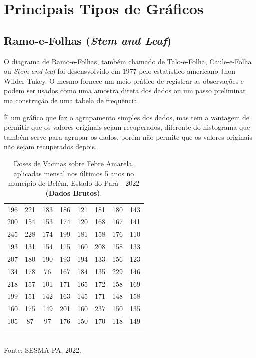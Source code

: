 \section{Principais Tipos de Gráficos}
\subsection{Ramo-e-Folhas (\textit{Stem and Leaf})}

O diagrama de Ramo-e-Folhas, também chamado de Talo-e-Folha, Caule-e-Folha ou \textit{Stem and leaf} foi desensvolvido em 1977 pelo estatístico americano Jhon Wilder Tukey. O mesmo fornece um meio prático de registrar as observações e podem ser usados como uma amostra direta dos dados ou um passo preliminar ma construção de uma tabela de frequência.\vskip0.3cm


È um gráfico que faz o agrupamento simples dos dados, mas tem a vantagem de permitir que os valores originais sejam recuperados, diferente do histograma que também serve para agrupar os dados, porém não permite que os valores originais não sejam recuperados depois.\vskip0.3cm


\begin{table}[!htb]
    \centering
    {
\caption{Doses de Vacinas sobre Febre Amarela, aplicadas mensal nos últimos 5 anos no muncípio de Belém, Estado do Pará - 2022 \textbf{(Dados Brutos)}.}
    \label{febreamarela}
    \vspace{0.1cm}
\begin{tabular}{c|c|c|c|c|c|c|c}
  \hline \hline
  196 & 221 & 183 & 186 & 121 & 181 & 180 & 143  \\
  200 & 154 & 153 & 174 & 120 & 168 & 167 & 141  \\
  245 & 228 & 174 & 199 & 181 & 158 & 176 & 110  \\
  193 & 131 & 154 & 115 & 160 & 208 & 158 & 133  \\
  207 & 180 & 190 & 193 & 194 & 133 & 156 & 123  \\
  134 & 178 &  76 & 167 & 184 & 135 & 229 & 146  \\
  218 & 157 & 101 & 171 & 165 & 172 & 158 & 169  \\
  199 & 151 & 142 & 163 & 145 & 171 & 148 & 158  \\
  160 & 175 & 149 & 201 & 160 & 237 & 150 & 135  \\
  105 & 87  & 97  & 176 & 150 & 170 & 118 & 149  \\
\hline \hline
\end{tabular}}
\\
\hspace{-4.0cm} Fonte: SESMA-PA, 2022.
\end{table}


